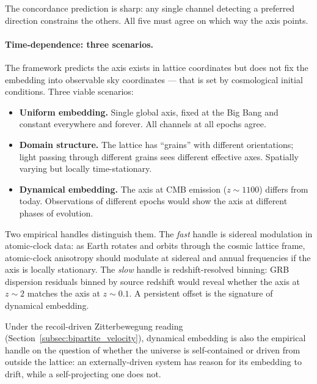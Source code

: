 The concordance prediction is sharp: any single channel detecting a
preferred direction constrains the others.  All five must agree on
which way the axis points.

\paragraph{Time-dependence: three scenarios.}
The framework predicts the axis exists in lattice coordinates but does
not fix the embedding into observable sky coordinates --- that is set
by cosmological initial conditions.  Three viable scenarios:
\begin{itemize}
    \item \textbf{Uniform embedding.}  Single global axis, fixed at
        the Big Bang and constant everywhere and forever.  All
        channels at all epochs agree.
    \item \textbf{Domain structure.}  The lattice has ``grains'' with
        different orientations; light passing through different
        grains sees different effective axes.  Spatially varying but
        locally time-stationary.
    \item \textbf{Dynamical embedding.}  The axis at CMB emission
        ($z \sim 1100$) differs from today.  Observations of different
        epochs would show the axis at different phases of evolution.
\end{itemize}
Two empirical handles distinguish them.  The \emph{fast} handle is
sidereal modulation in atomic-clock data: as Earth rotates and orbits
through the cosmic lattice frame, atomic-clock anisotropy should
modulate at sidereal and annual frequencies if the axis is locally
stationary.  The \emph{slow} handle is redshift-resolved binning: GRB
dispersion residuals binned by source redshift would reveal whether
the axis at $z \sim 2$ matches the axis at $z \sim 0.1$.  A persistent
offset is the signature of dynamical embedding.

Under the recoil-driven Zitterbewegung reading
(Section~\ref{subsec:bipartite_velocity}), dynamical embedding is also
the empirical handle on the question of whether the universe is
self-contained or driven from outside the lattice: an externally-driven
system has reason for its embedding to drift, while a self-projecting
one does not.

